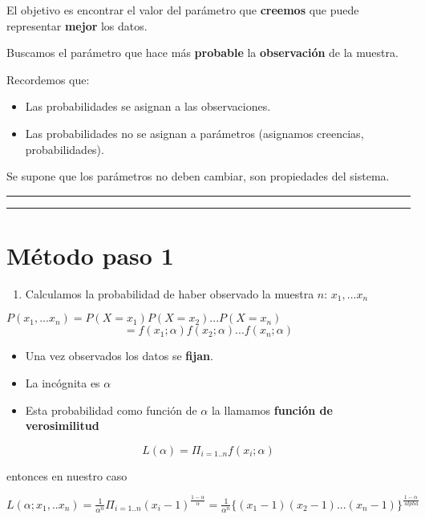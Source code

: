 \documentclass[
]{book}
\providecommand{\tightlist}{%
  \setlength{\itemsep}{0pt}\setlength{\parskip}{0pt}}
\begin{document}
El objetivo es encontrar el valor del parámetro que \textbf{creemos} que puede representar \textbf{mejor} los datos.

Buscamos el parámetro que hace más \textbf{probable} la \textbf{observación} de la muestra.

Recordemos que:

\begin{itemize}
\tightlist
\item
  Las probabilidades se asignan a las observaciones.
\item
  Las probabilidades no se asignan a parámetros (asignamos creencias, probabilidades).
\end{itemize}

Se supone que los parámetros no deben cambiar, son propiedades del sistema.

\begin{center}\rule{0.5\linewidth}{0.5pt}\end{center}

\begin{center}\rule{0.5\linewidth}{0.5pt}\end{center}

\hypertarget{muxe9todo-paso-1}{%
\section{Método paso 1}\label{muxe9todo-paso-1}}

\begin{enumerate}
\def\labelenumi{\arabic{enumi}.}
\tightlist
\item
  Calculamos la probabilidad de haber observado la muestra \(n\): \(x_1,...x_n\)
\end{enumerate}

\(P(x_1,...x_n)=P(X=x_1)P(X=x_2)...P(X=x_n)\)
\[=f(x_1;\alpha)f(x_2;\alpha) ...f(x_n;\alpha)\]

\begin{itemize}
\tightlist
\item
  Una vez observados los datos se \textbf{fijan}.
\item
  La incógnita es \(\alpha\)
\item
  Esta probabilidad como función de \(\alpha\) la llamamos \textbf{función de verosimilitud}
\end{itemize}

\[L(\alpha)= \Pi_{i=1..n} f(x_i; \alpha)\]

entonces en nuestro caso

\(L(\alpha;x_1,..x_n)= \frac{1}{\alpha^n} \Pi_{i=1..n} (x_i-1)^{\frac{1-\alpha}{ \alpha}}= \frac{1}{\alpha^n} \{(x_1-1)(x_2-1)...(x_n-1)\}^{\frac{1-\alpha}{\ alpha}}\)
\end{document}
